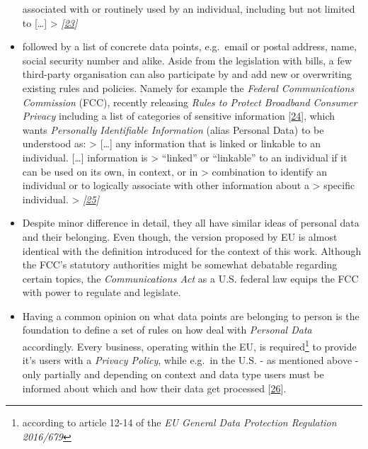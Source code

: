 \documentclass[12pt,english,a4paper,titlepage,cleardoublepage=empty,dottedtoc]{report}
\begin{document}
\begin{itemize}
  associated with or routinely used by an individual, including but not
  limited to {[}\ldots{}{]} \textgreater{}
  \emph{{[}\protect\hyperlink{ref-bill-draft_2015_us_consumer-privacy-bill-of-rights-act_definition}{23}{]}}
\item
  followed by a list of concrete data points, e.g.~email or postal
  address, name, social security number and alike. Aside from the
  legislation with bills, a few third-party organisation can also
  participate by and add new or overwriting existing rules and policies.
  Namely for example the \emph{Federal Communications Commission} (FCC),
  recently releasing \emph{Rules to Protect Broadband Consumer Privacy}
  including a list of categories of sensitive information
  {[}\protect\hyperlink{ref-rules_2016_fcc_to-protect-broadband-consumer-privacy_sensitive-types-of-data}{24}{]},
  which wants \emph{Personally Identifiable Information} (alias Personal
  Data) to be understood as: \textgreater{} {[}\ldots{}{]} any
  information that is linked or linkable to an individual.
  {[}\ldots{}{]} information is \textgreater{} ``linked'' or
  ``linkable'' to an individual if it can be used on its own, in
  context, or in \textgreater{} combination to identify an individual or
  to logically associate with other information about a \textgreater{}
  specific individual. \textgreater{}
  \emph{{[}\protect\hyperlink{ref-rules_2016_fcc_to-protect-broadband-consumer-privacy_personally-identifiable-information}{25}{]}}
\item
  Despite minor difference in detail, they all have similar ideas of
  personal data and their belonging. Even though, the version proposed
  by EU is almost identical with the definition introduced for the
  context of this work. Although the FCC's statutory authorities might
  be somewhat debatable regarding certain topics, the
  \emph{Communications Act} as a U.S. federal law equips the FCC with
  power to regulate and legislate.
\item
  Having a common opinion on what data points are belonging to person is
  the foundation to define a set of rules on how deal with
  \emph{Personal Data} accordingly. Every business, operating within the
  EU, is required\footnote{according to article 12-14 of the \emph{EU
    General Data Protection Regulation 2016/679}} to provide it's users
  with a \emph{Privacy Policy}, while e.g.~in the U.S. - as mentioned
  above - only partially and depending on context and data type users
  must be informed about which and how their data get processed
  {[}\protect\hyperlink{ref-web_2016_privacy-policies-are-mandatory-by-law}{26}{]}.

\end{itemize}
\end{document}
